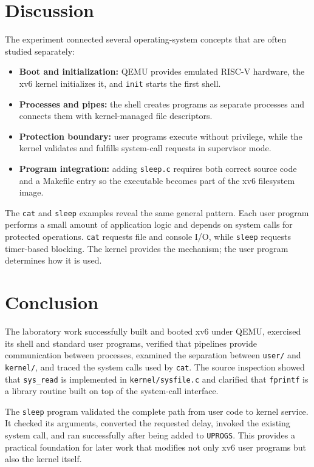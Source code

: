 \documentclass[12pt]{article}
\newcommand{\commandname}[1]{\texttt{#1}}
\begin{document}
\section{Discussion}

The experiment connected several operating-system concepts that are often studied separately:

\begin{itemize}
    \item \textbf{Boot and initialization:} QEMU provides emulated RISC-V hardware, the xv6 kernel initializes it, and \commandname{init} starts the first shell.
    \item \textbf{Processes and pipes:} the shell creates programs as separate processes and connects them with kernel-managed file descriptors.
    \item \textbf{Protection boundary:} user programs execute without privilege, while the kernel validates and fulfills system-call requests in supervisor mode.
    \item \textbf{Program integration:} adding \commandname{sleep.c} requires both correct source code and a Makefile entry so the executable becomes part of the xv6 filesystem image.
\end{itemize}

The \commandname{cat} and \commandname{sleep} examples reveal the same general pattern. Each user program performs a small amount of application logic and depends on system calls for protected operations. \commandname{cat} requests file and console I/O, while \commandname{sleep} requests timer-based blocking. The kernel provides the mechanism; the user program determines how it is used.

\section{Conclusion}

The laboratory work successfully built and booted xv6 under QEMU, exercised its shell and standard user programs, verified that pipelines provide communication between processes, examined the separation between \commandname{user/} and \commandname{kernel/}, and traced the system calls used by \commandname{cat}. The source inspection showed that \commandname{sys\_read} is implemented in \commandname{kernel/sysfile.c} and clarified that \commandname{fprintf} is a library routine built on top of the system-call interface.

The \commandname{sleep} program validated the complete path from user code to kernel service. It checked its arguments, converted the requested delay, invoked the existing system call, and ran successfully after being added to \commandname{UPROGS}. This provides a practical foundation for later work that modifies not only xv6 user programs but also the kernel itself.
\end{document}

